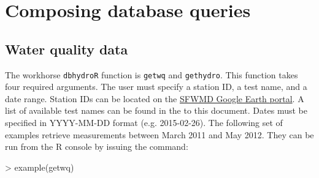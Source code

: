 \documentclass[12pt,notitlepage]{article}
\begin{document}
\section{Composing database queries}
\subsection{Water quality data}

The workhorse \texttt{dbhydroR} function is \verb|getwq| and \texttt{gethydro}. This function takes four required arguments. The user must specify a station ID, a test name, and a date range. Station IDs can be located on the \href{http://my.sfwmd.gov/KMLEXT/CUSTOMKMLS/DBHydro/DBHydroKML/DBHYDRO_KML.kmz}{SFWMD Google Earth portal}. A list of available test names can be found in the  to this document. Dates must be specified in YYYY-MM-DD format (e.g. 2015-02-26).   The following set of examples retrieve measurements between March 2011 and May 2012. They can be run from the R console by issuing the command:

\begin{Schunk}
\begin{Sinput}
> example(getwq)
\end{Sinput}
\end{Schunk}
\end{document}
